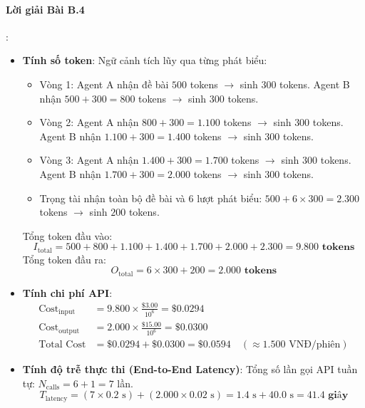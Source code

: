 \paragraph{Lời giải Bài B.4}:
\begin{itemize}
  \item[a)] \textbf{Tính số token}:
  Ngữ cảnh tích lũy qua từng phát biểu:
  \begin{itemize}
    \item Vòng 1: Agent A nhận đề bài $500$ tokens $\to$ sinh $300$ tokens. Agent B nhận $500 + 300 = 800$ tokens $\to$ sinh $300$ tokens.
    \item Vòng 2: Agent A nhận $800 + 300 = 1.100$ tokens $\to$ sinh $300$ tokens. Agent B nhận $1.100 + 300 = 1.400$ tokens $\to$ sinh $300$ tokens.
    \item Vòng 3: Agent A nhận $1.400 + 300 = 1.700$ tokens $\to$ sinh $300$ tokens. Agent B nhận $1.700 + 300 = 2.000$ tokens $\to$ sinh $300$ tokens.
    \item Trọng tài nhận toàn bộ đề bài và 6 lượt phát biểu: $500 + 6 \times 300 = 2.300$ tokens $\to$ sinh $200$ tokens.
  \end{itemize}
  Tổng token đầu vào:
  \begin{equation*}
  I_{\text{total}} = 500 + 800 + 1.100 + 1.400 + 1.700 + 2.000 + 2.300 = \mathbf{9.800\text{ tokens}}
  \end{equation*}
  Tổng token đầu ra:
  \begin{equation*}
  O_{\text{total}} = 6 \times 300 + 200 = \mathbf{2.000\text{ tokens}}
  \end{equation*}

  \item[b)] \textbf{Tính chi phí API}:
  \begin{align*}
  \text{Cost}_{\text{input}} &= 9.800 \times \frac{\$3.00}{10^6} = \$0.0294 \\
  \text{Cost}_{\text{output}} &= 2.000 \times \frac{\$15.00}{10^6} = \$0.0300 \\
  \text{Total Cost} &= \$0.0294 + \$0.0300 = \mathbf{\$0.0594} \quad (\approx 1.500\text{ VNĐ/phiên})
  \end{align*}

  \item[c)] \textbf{Tính độ trễ thực thi (End-to-End Latency)}:
  Tổng số lần gọi API tuần tự: $N_{\text{calls}} = 6 + 1 = 7$ lần.
  \begin{equation*}
  T_{\text{latency}} = (7 \times 0.2\text{ s}) + (2.000 \times 0.02\text{ s}) = 1.4\text{ s} + 40.0\text{ s} = \mathbf{41.4\text{ giây}}
  \end{equation*}
\end{itemize}

